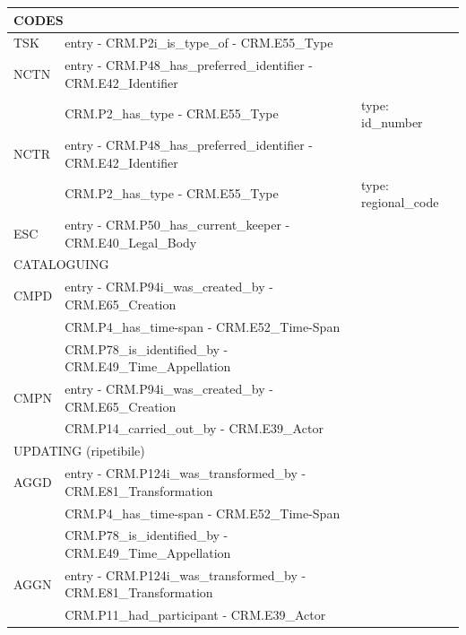 \begin{center}
\begin{longtable}{ | p{1cm} | p{8cm} | p{3cm} | }
  \multicolumn{3}{|l|}{\cellcolor{lightcyan}CODES}\\ \hline
  TSK &  entry - CRM.P2i\_is\_type\_of - CRM.E55\_Type & \\ \hline
  NCTN &  entry - CRM.P48\_has\_preferred\_identifier - CRM.E42\_Identifier & \\
   & CRM.P2\_has\_type - CRM.E55\_Type & type: id\_number \\ \hline
  NCTR &  entry - CRM.P48\_has\_preferred\_identifier - CRM.E42\_Identifier & \\
   & CRM.P2\_has\_type - CRM.E55\_Type & type: regional\_code \\ \hline
  ESC & entry - CRM.P50\_has\_current\_keeper - CRM.E40\_Legal\_Body & \\ \hline
  
  \multicolumn{3}{|l|}{\cellcolor{lightcyan}CATALOGUING}\\ \hline
  CMPD &  entry - CRM.P94i\_was\_created\_by - CRM.E65\_Creation & \\
   & CRM.P4\_has\_time-span - CRM.E52\_Time-Span & \\
   & CRM.P78\_is\_identified\_by - CRM.E49\_Time\_Appellation & \\ \hline
  CMPN &  entry - CRM.P94i\_was\_created\_by - CRM.E65\_Creation & \\
   & CRM.P14\_carried\_out\_by - CRM.E39\_Actor & \\ \hline
  
  \multicolumn{3}{|l|}{\cellcolor{lightcyan}UPDATING (ripetibile)}\\ \hline
  AGGD &  entry - CRM.P124i\_was\_transformed\_by - CRM.E81\_Transformation & \\
   & CRM.P4\_has\_time-span - CRM.E52\_Time-Span & \\
   & CRM.P78\_is\_identified\_by - CRM.E49\_Time\_Appellation & \\ \hline
  AGGN &  entry - CRM.P124i\_was\_transformed\_by - CRM.E81\_Transformation & \\
   & CRM.P11\_had\_participant - CRM.E39\_Actor & \\ \hline


\end{longtable}
\end{center}
